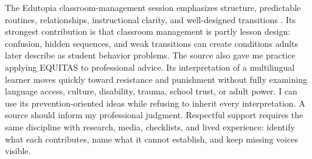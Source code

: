 \vspace{-0.2cm}
The Edutopia classroom-management session emphasizes structure, predictable routines, relationships, instructional clarity, and well-designed transitions \citep{edutopiaClassroom}. Its strongest contribution is that classroom management is partly lesson design: confusion, hidden sequences, and weak transitions can create conditions adults later describe as student behavior problems. The source also gave me practice applying EQUITAS to professional advice. Its interpretation of a multilingual learner moves quickly toward resistance and punishment without fully examining language access, culture, disability, trauma, school trust, or adult power. I can use its prevention-oriented ideas while refusing to inherit every interpretation. A source should inform my professional judgment. Respectful support requires the same discipline with research, media, checklists, and lived experience: identify what each contributes, name what it cannot establish, and keep missing voices visible.
